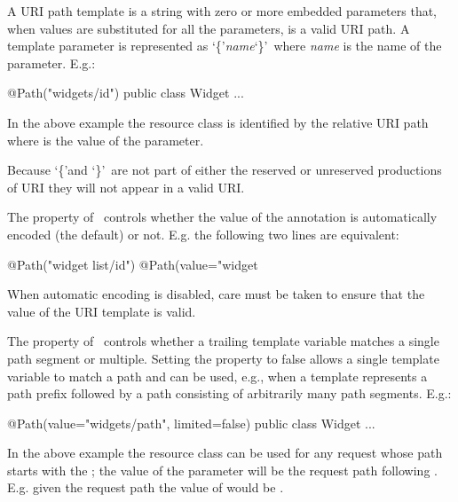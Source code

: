 A URI path template is a string with zero or more embedded parameters that, when values are substituted for all the parameters, is a valid URI\cite{uri} path. A template parameter is represented as \lq\{\rq{\em name}\lq\}\rq\ where {\em name} is the name of the parameter. E.g.:

\begin{listing}{1}
@Path("widgets/{id}")
public class Widget {
  ...
}\end{listing}

In the above example the  resource class is identified by the relative URI path  where  is the value of the  parameter.

\begin{nnnote}Because \lq\{\rq and \lq\}\rq\ are not part of either the reserved or unreserved productions of URI\cite{uri} they will not appear in a valid URI.\end{nnnote}

The  property of \Path\ controls whether the value of the annotation is automatically encoded (the default) or not. E.g. the following two lines are equivalent:

\begin{listing}{1}
@Path("widget list/{id}")
@Path(value="widget%
\end{listing}

When automatic encoding is disabled, care must be taken to ensure that the value of the URI template is valid.

The  property of \Path\ controls whether a trailing template variable matches a single path segment or multiple. Setting the property to false allows a single template variable to match a path and can be used, e.g., when a template represents a path prefix followed by a path consisting of arbitrarily many path segments. E.g.:

\begin{listing}{1}
@Path(value="widgets/{path}", limited=false)
public class Widget {
  ...
}\end{listing}

In the above example the  resource class can be used for any request whose path starts with the ; the value of the  parameter will be the request path following . E.g. given the request path  the value of  would be .

